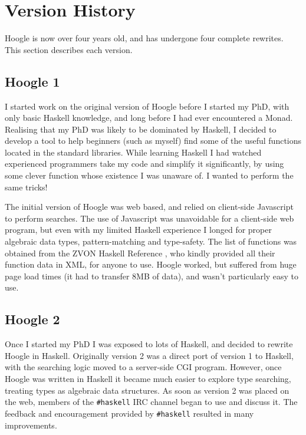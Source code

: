 \documentclass{tmr}
\begin{document}
\section{Version History}

Hoogle is now over four years old, and has undergone four complete rewrites. This section describes each version.

\subsection{Hoogle 1}

I started work on the original version of Hoogle before I started my PhD, with only basic Haskell knowledge, and long before I had ever encountered a Monad. Realising that my PhD was likely to be dominated by Haskell, I decided to develop a tool to help beginners (such as myself) find some of the useful functions located in the standard libraries. While learning Haskell I had watched experienced programmers take my code and simplify it significantly, by using some clever function whose existence I was unaware of. I wanted to perform the same tricks!

The initial version of Hoogle was web based, and relied on client-side Javascript to perform searches. The use of Javascript was unavoidable for a client-side web program, but even with my limited Haskell experience I longed for proper algebraic data types, pattern-matching and type-safety. The list of functions was obtained from the ZVON Haskell Reference \cite{zvon}, who kindly provided all their function data in XML, for anyone to use. Hoogle worked, but suffered from huge page load times (it had to transfer 8MB of data), and wasn't particularly easy to use.

\subsection{Hoogle 2}

Once I started my PhD I was exposed to lots of Haskell, and decided to rewrite Hoogle in Haskell. Originally version 2 was a direct port of version 1 to Haskell, with the searching logic moved to a server-side CGI program. However, once Hoogle was written in Haskell it became much easier to explore type searching, treating types as algebraic data structures. As soon as version 2 was placed on the web, members of the \verb"#haskell" IRC channel \cite{irc} began to use and discuss it. The feedback and encouragement provided by \verb"#haskell" resulted in many improvements.
\end{document}
